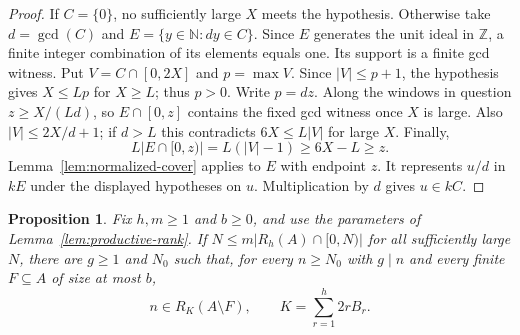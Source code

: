 \documentclass[11pt,reqno]{amsart}
\newtheorem{proposition}[theorem]{Proposition}
\theoremstyle{definition}
\theoremstyle{remark}
\begin{document}
\begin{proof}
If \(C=\{0\}\), no sufficiently large \(X\) meets the hypothesis.
Otherwise take \(d=\gcd(C)\) and \(E=\{y\in\mathbb N:dy\in C\}\).
Since \(E\) generates the unit ideal in \(\mathbb Z\), a finite
integer combination of its elements equals one. Its support is a
finite gcd witness.
Put \(V=C\cap[0,2X]\) and \(p=\max V\). Since \(|V|\le p+1\),
the hypothesis gives \(X\le Lp\) for \(X\ge L\); thus \(p>0\).
Write \(p=dz\). Along the windows in question \(z\ge X/(Ld)\),
so \(E\cap[0,z]\) contains the fixed gcd witness once \(X\) is large.
Also \(|V|\le 2X/d+1\); if \(d>L\) this contradicts
\(6X\le L|V|\) for large \(X\). Finally,
\[
   L|E\cap[0,z)|=L(|V|-1)\ge6X-L\ge z .
\]
Lemma~\ref{lem:normalized-cover} applies to \(E\) with endpoint
\(z\). It represents \(u/d\) in \(kE\) under the displayed
hypotheses on \(u\). Multiplication by \(d\) gives \(u\in kC\).
\end{proof}

\begin{proposition}\label{prop:padded-progression}
Fix \(h,m\ge1\) and \(b\ge0\), and use the parameters of
Lemma~\ref{lem:productive-rank}. If
\(N\le m|R_h(A)\cap[0,N)|\) for all sufficiently large \(N\),
there are \(g\ge1\) and \(N_0\)
such that, for every \(n\ge N_0\) with \(g\mid n\) and every
finite \(F\subseteq A\) of size at most \(b\),
\[
    n\in R_K(A\setminus F),\qquad K=\sum_{r=1}^h 2rB_r .
\]
\end{proposition}
\end{document}
